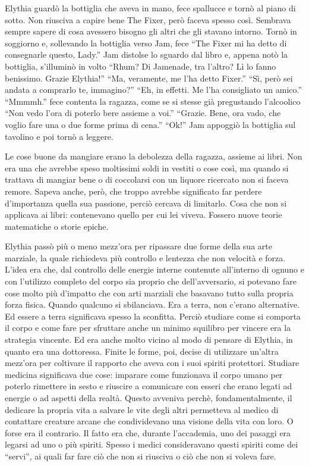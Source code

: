     Elythia guardò la bottiglia che aveva in mano, fece spallucce e tornò
    al piano di sotto. Non riusciva a capire bene The Fixer, però faceva
    spesso così. Sembrava sempre sapere di cosa avessero bisogno gli altri
    che gli stavano intorno. Tornò in soggiorno e, sollevando la bottiglia
    verso Jam, fece ``The Fixer mi ha detto di consegnarle questo, Lady.''
    Jam distolse lo sguardo dal libro e, appena notò la bottiglia,
    s'illuminò in volto ``Rhum? Di Jamenade, tra l'altro? Lì lo fanno
    benissimo. Grazie Elythia!'' ``Ma, veramente, me l'ha detto Fixer.''
    ``Sì, però sei andata a comprarlo te, immagino?'' ``Eh, in effetti. Me
    l'ha consigliato un amico.'' ``Mmmmh.'' fece contenta la ragazza, come
    se si stesse già pregustando l'alcoolico ``Non vedo l'ora di poterlo
    bere assieme a voi.'' ``Grazie. Bene, ora vado, che voglio fare una o
    due forme prima di cena.'' ``Ok!'' Jam appoggiò la bottiglia sul
    tavolino e poi tornò a leggere.

    Le cose buone da mangiare erano la debolezza della ragazza, assieme ai
    libri. Non era una che avrebbe speso moltissimi soldi in vestiti o cose
    così, ma quando si trattava di mangiar bene o di coccolarsi con un
    liquore ricercato non si faceva remore. Sapeva anche, però, che
    troppo avrebbe significato far perdere d'importanza quella sua
    passione, perciò cercava di limitarlo. Cosa che non si applicava ai
    libri: contenevano quello per cui lei viveva. Fossero nuove teorie
    matematiche o storie epiche.

    Elythia passò più o meno mezz'ora per ripassare due forme della sua arte
    marziale, la quale richiedeva più controllo e lentezza che non velocità
    e forza. L'idea era che, dal controllo delle energie interne contenute
    all'interno di ognuno e con l'utilizzo completo del corpo sia proprio
    che dell'avversario, si potevano fare cose molto più d'impatto che con
    arti marziali che basavano tutto sulla propria forza fisica. Quando
    qualcuno si sbilanciava. Era a terra, non c'erano alternative. Ed
    essere a terra significava spesso la sconfitta. Perciò studiare come si
    comporta il corpo e come fare per sfruttare anche un minimo squilibro
    per vincere era la strategia vincente. Ed era anche molto vicino al
    modo di pensare di Elythia, in quanto era una dottoressa. Finite le
    forme, poi, decise di utilizzare un'altra mezz'ora per coltivare il
    rapporto che aveva con i suoi spiriti protettori. Studiare medicina
    significava due cose: imparare come funzionava il corpo umano per
    poterlo rimettere in sesto e riuscire a comunicare con esseri che erano
    legati ad energie o ad aspetti della realtà. Questo avveniva perchè,
    fondamentalmente, il dedicare la propria vita a salvare le vite degli
    altri permetteva al medico di contattare creature arcane che
    condividevano una visione della vita con loro. O forse era il
    contrario. Il fatto era che, durante l'accademia, uno dei pasaggi era
    legarsi ad uno o più spiriti. Spesso i medici consideravano questi
    spiriti come dei ``servi'', ai quali far fare ciò che non si riusciva o
    ciò che non si voleva fare. 
    
